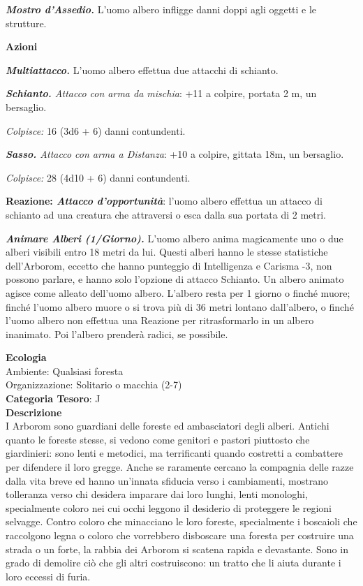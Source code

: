 \begin{multicols}{2}
{\emph{\textbf{Mostro d'Assedio.}} L'uomo albero infligge danni doppi agli oggetti e le strutture.

\textbf{Azioni}

\emph{\textbf{Multiattacco.}} L'uomo albero effettua due attacchi di schianto.

\emph{\textbf{Schianto.} Attacco con arma da mischia}: +11 a colpire, portata 2 m, un bersaglio.

\emph{Colpisce:} 16 (3d6 + 6) danni contundenti.

\emph{\textbf{Sasso.} Attacco con arma a Distanza}: +10 a colpire, gittata 18m, un bersaglio.

\emph{Colpisce:} 28 (4d10 + 6) danni contundenti.

\textbf{Reazione: \emph{Attacco d'opportunità}}: l'uomo albero effettua un attacco di schianto ad una creatura che attraversi o esca dalla sua portata di 2 metri.

\emph{\textbf{Animare Alberi (1/Giorno).}} L'uomo albero anima magicamente uno o due alberi visibili entro 18 metri da lui. Questi alberi hanno le stesse statistiche dell'Arborom, eccetto che hanno punteggio di Intelligenza e Carisma -3, non possono parlare, e hanno solo l'opzione di attacco Schianto. Un albero animato agisce come alleato dell'uomo albero. L'albero resta per 1 giorno o finché muore; finché l'uomo albero muore o si trova più di 36 metri lontano dall'albero, o finché l'uomo albero non effettua una Reazione per ritrasformarlo in un albero inanimato. Poi l'albero prenderà radici, se possibile.

\textbf{Ecologia}\\
Ambiente: Qualsiasi foresta\\
Organizzazione: Solitario o macchia (2-7)\\
\textbf{Categoria Tesoro}: J\\
\textbf{Descrizione}\\
I Arborom sono guardiani delle foreste ed ambasciatori degli alberi. Antichi quanto le foreste stesse, si vedono come genitori e pastori piuttosto che giardinieri: sono lenti e metodici, ma terrificanti quando costretti a combattere per difendere il loro gregge. Anche se raramente cercano la compagnia delle razze dalla vita breve ed hanno un'innata sfiducia verso i cambiamenti, mostrano tolleranza verso chi desidera imparare dai loro lunghi, lenti monologhi, specialmente coloro nei cui occhi leggono il desiderio di proteggere le regioni selvagge. Contro coloro che minacciano le loro foreste, specialmente i boscaioli che raccolgono legna o coloro che vorrebbero disboscare una foresta per costruire una strada o un forte, la rabbia dei Arborom si scatena rapida e devastante. Sono in grado di demolire ciò che gli altri costruiscono: un tratto che li aiuta durante i loro eccessi di furia.

}
\end{multicols}
